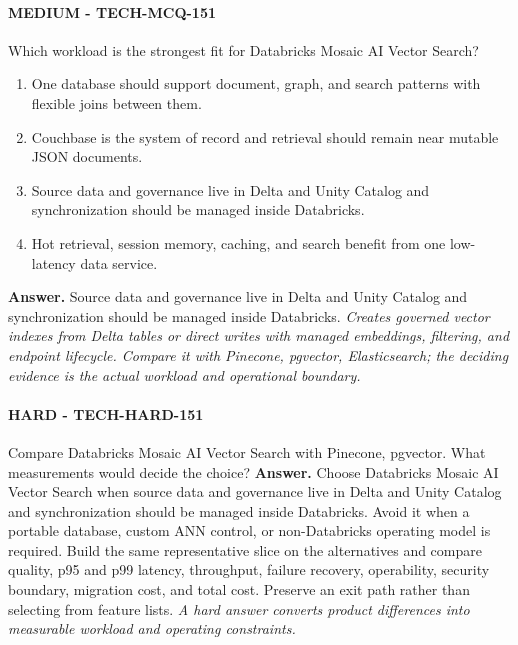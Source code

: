 \paragraph{MEDIUM - TECH-MCQ-151} Which workload is the strongest fit for Databricks Mosaic AI Vector Search?
\begin{enumerate}[label=\Alph*.]
\item One database should support document, graph, and search patterns with flexible joins between them.
\item Couchbase is the system of record and retrieval should remain near mutable JSON documents.
\item Source data and governance live in Delta and Unity Catalog and synchronization should be managed inside Databricks.
\item Hot retrieval, session memory, caching, and search benefit from one low-latency data service.
\end{enumerate}
\textbf{Answer.} Source data and governance live in Delta and Unity Catalog and synchronization should be managed inside Databricks.
\textit{Creates governed vector indexes from Delta tables or direct writes with managed embeddings, filtering, and endpoint lifecycle. Compare it with Pinecone, pgvector, Elasticsearch; the deciding evidence is the actual workload and operational boundary.}
\paragraph{HARD - TECH-HARD-151} Compare Databricks Mosaic AI Vector Search with Pinecone, pgvector. What measurements would decide the choice?
\textbf{Answer.} Choose Databricks Mosaic AI Vector Search when source data and governance live in Delta and Unity Catalog and synchronization should be managed inside Databricks. Avoid it when a portable database, custom ANN control, or non-Databricks operating model is required. Build the same representative slice on the alternatives and compare quality, p95 and p99 latency, throughput, failure recovery, operability, security boundary, migration cost, and total cost. Preserve an exit path rather than selecting from feature lists.
\textit{A hard answer converts product differences into measurable workload and operating constraints.}
